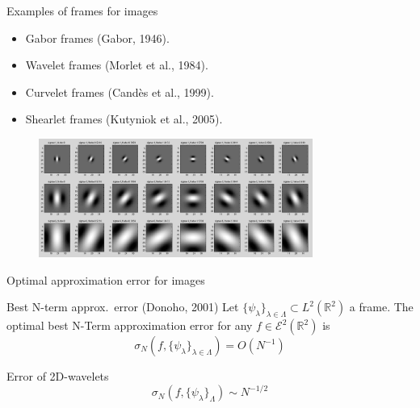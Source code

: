 \begin{frame}{Examples of frames for images}
\begin{itemize}
\item Gabor frames (Gabor, 1946).

\bigskip
\item Wavelet frames (Morlet et al., 1984).

\bigskip
\item Curvelet frames (Cand\`es et al., 1999).

\bigskip

\item Shearlet frames (Kutyniok et al., 2005).
\end{itemize}

\begin{figure}[h!]
\centering
\includegraphics[width=0.8\textwidth, height=0.5\textheight]{./Images/STFTWave.png}
\end{figure}
\end{frame}


\begin{frame}{Optimal approximation error for images}
\begin{block}{Best N-term approx.\ error (Donoho, 2001)}
Let $\{\psi_{\lambda}\}_{\lambda\in\Lambda}\subset L^2(\mathbb{R}^2)$ a frame. The optimal best N-Term approximation error for any $f\in\mathcal{E}^2(\mathbb{R}^2)$ is
$$
\sigma_N(f,\{\psi_{\lambda}\}_{\lambda\in\Lambda})=O(N^{-1})
$$
\end{block}
\pause
\begin{block}{Error of 2D-wavelets}
$$
\sigma_N(f,\{\psi_{\lambda}\}_{\Lambda})\sim N^{-1/2}
$$
\end{block}
\pause
\end{frame}


